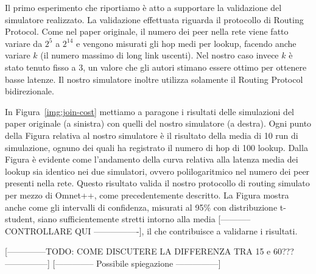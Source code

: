 \documentclass[prodmode,acmtap]{acmlarge}
\begin{document}
Il primo esperimento che riportiamo è atto a supportare la validazione del simulatore realizzato. La validazione effettuata riguarda il protocollo di Routing Protocol. Come nel paper originale, il numero dei peer nella rete viene fatto variare da $2^5$ a $2^{14}$ e vengono misurati gli hop medi per lookup, facendo anche variare $k$ (il numero massimo di long link uscenti). Nel nostro caso invece $k$ è stato tenuto fisso a $3$, un valore che gli autori stimano essere ottimo per ottenere basse latenze. Il nostro simulatore inoltre utilizza solamente il Routing Protocol bidirezionale.

In Figura~\ref{img:join-cost} mettiamo a paragone i risultati delle simulazioni del paper originale (a sinistra) con quelli del nostro simulatore (a destra). Ogni punto della Figura relativa al nostro simulatore è il risultato della media di 10 run di simulazione, ognuno dei quali ha registrato il numero di hop di 100 lookup. Dalla Figura è evidente come l'andamento della curva relativa alla latenza media dei lookup sia identico nei due simulatori, ovvero polilogaritmico nel numero dei peer presenti nella rete. Questo risultato valida il nostro protocollo di routing simulato per mezzo di Omnet++, come precedentemente descritto. La Figura mostra anche come gli intervalli di confidenza, misurati al 95\% con distribuzione t-student, siano sufficientemente stretti intorno alla media [----------- CONTROLLARE QUI ----------------], il che contribuisce a validarne i risultati.

[--------------TODO: COME DISCUTERE LA DIFFERENZA TRA 15 e 60??? ---------------]
[-------------- Possibile spiegazione ---------------]
\end{document}
